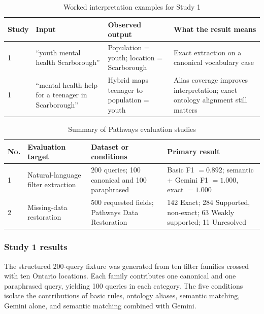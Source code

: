 \documentclass[12pt,oneside]{report}
\begin{document}
\begin{table}[H]
\caption{Worked interpretation examples for Study 1}
\label{tab:cross_study_examples}
\centering
\small
\begin{tabularx}{\textwidth}{@{}p{1.4cm}p{3.0cm}X X@{}}
\toprule
\textbf{Study} & \textbf{Input} & \textbf{Observed output} & \textbf{What the result means} \\
\midrule
1 & ``youth mental health Scarborough'' & Population = youth; location = Scarborough & Exact extraction on a canonical vocabulary case \\
1 & ``mental health help for a teenager in Scarborough'' & Hybrid maps teenager to population = youth & Alias coverage improves interpretation; exact ontology alignment still matters \\
\bottomrule
\end{tabularx}
\end{table}

\begin{table}[H]
\caption{Summary of Pathways evaluation studies}
\label{tab:pathways_study_summary}
\centering
\small
\begin{tabularx}{\textwidth}{@{}p{1.4cm}p{3.0cm}X X@{}}
\toprule
\textbf{No.} & \textbf{Evaluation target} & \textbf{Dataset or conditions} & \textbf{Primary result} \\
\midrule
1 & Natural-language filter extraction & 200 queries; 100 canonical and 100 paraphrased & Basic F1 $=0.892$; semantic + Gemini F1 $=1.000$, exact $=1.000$ \\
2 & Missing-data restoration & 500 requested fields; Pathways Data Restoration & 142 Exact; 284 Supported, non-exact; 63 Weakly supported; 11 Unresolved \\
\bottomrule
\end{tabularx}
\end{table}

\subsubsection{Study 1 results}
The structured 200-query fixture was generated from ten filter families crossed with ten Ontario
locations. Each family contributes one canonical and one paraphrased query,
yielding 100 queries in each category. The five conditions isolate the
contributions of basic rules, ontology aliases, semantic matching, Gemini
alone, and semantic matching combined with Gemini.
\end{document}
